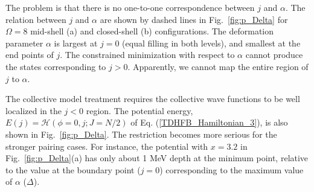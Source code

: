 \documentclass[%
superscriptaddress,
preprint,
showpacs,
nofootinbib,
amsmath,amssymb,
aps,
prc,
floatfix ]%
{revtex4-1}
\begin{document}

The problem is that
there is no one-to-one correspondence between $j$ and $\alpha$.
The relation between $j$ and $\alpha$ 
are shown by dashed lines in Fig.~\ref{fig:p_Delta}
for $\Omega=8$ mid-shell (a) and closed-shell (b) configurations.
The deformation parameter $\alpha$ is largest at $j=0$ (equal filling in both levels),
and smallest at the end points of $j$.
The constrained minimization with respect to $\alpha$ cannot 
produce the states corresponding to $j>0$.
Apparently, we cannot map the entire region of $j$ to $\alpha$.

The collective model treatment
requires the collective wave functions to be well localized
in the $j<0$ region.
The potential energy, $E(j)=\mathcal{H}(\phi=0,j;J=N/2)$ of
Eq. (\ref{TDHFB_Hamiltonian_3}), is also shown in
Fig.~\ref{fig:p_Delta}.
The restriction becomes more serious for the stronger pairing cases.
For instance, the potential with $x=3.2$ in Fig.~\ref{fig:p_Delta}(a)
has only about 1 MeV depth at the minimum point, relative to the value
at the boundary point ($j=0$) corresponding to
the maximum value of $\alpha$ ($\Delta$).
\end{document}
